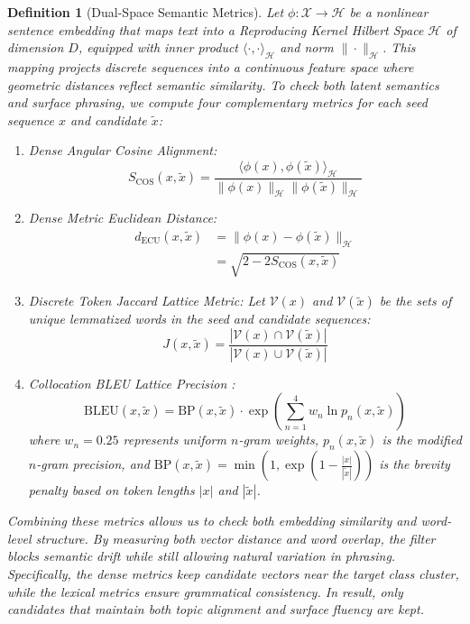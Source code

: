 \documentclass[10pt,journal,compsoc]{IEEEtran}
\newtheorem{definition}{Definition}
\begin{document}
\begin{definition}[Dual-Space Semantic Metrics]
Let $\phi: \mathcal{X} \to \mathcal{H}$ be a nonlinear sentence embedding that maps text into a Reproducing Kernel Hilbert Space $\mathcal{H}$ of dimension $D$, equipped with inner product $\langle \cdot, \cdot \rangle_\mathcal{H}$ and norm $\|\cdot\|_\mathcal{H}$. This mapping projects discrete sequences into a continuous feature space where geometric distances reflect semantic similarity. To check both latent semantics and surface phrasing, we compute four complementary metrics for each seed sequence $x$ and candidate $\tilde{x}$:
\begin{enumerate}
    \item Dense Angular Cosine Alignment:
    \begin{equation}
        S_{\text{COS}}(x, \tilde{x}) = \frac{\langle \phi(x), \phi(\tilde{x}) \rangle_\mathcal{H}}{\|\phi(x)\|_\mathcal{H} \|\phi(\tilde{x})\|_\mathcal{H}}
    \end{equation}
    \item Dense Metric Euclidean Distance:
    \begin{equation}
    \begin{aligned}
        d_{\text{ECU}}(x, \tilde{x}) &= \|\phi(x) - \phi(\tilde{x})\|_\mathcal{H} \\
        &= \sqrt{2 - 2 S_{\text{COS}}(x, \tilde{x})}
    \end{aligned}
    \end{equation}
    \item Discrete Token Jaccard Lattice Metric:
    Let $\mathcal{V}(x)$ and $\mathcal{V}(\tilde{x})$ be the sets of unique lemmatized words in the seed and candidate sequences:
    \begin{equation}
        J(x, \tilde{x}) = \frac{|\mathcal{V}(x) \cap \mathcal{V}(\tilde{x})|}{|\mathcal{V}(x) \cup \mathcal{V}(\tilde{x})|}
    \end{equation}
    \item Collocation BLEU Lattice Precision \cite{papineni2002bleu}:
    \begin{equation}
        \text{BLEU}(x, \tilde{x}) = \text{BP}(x, \tilde{x}) \cdot \exp\left(\sum_{n=1}^4 w_n \ln p_n(x, \tilde{x})\right)
    \end{equation}
    where $w_n = 0.25$ represents uniform $n$-gram weights, $p_n(x, \tilde{x})$ is the modified $n$-gram precision, and $\text{BP}(x, \tilde{x}) = \min\left(1, \exp\left(1 - \frac{|x|}{|\tilde{x}|}\right)\right)$ is the brevity penalty based on token lengths $|x|$ and $|\tilde{x}|$.
\end{enumerate}
Combining these metrics allows us to check both embedding similarity and word-level structure. By measuring both vector distance and word overlap, the filter blocks semantic drift while still allowing natural variation in phrasing. Specifically, the dense metrics keep candidate vectors near the target class cluster, while the lexical metrics ensure grammatical consistency. In result, only candidates that maintain both topic alignment and surface fluency are kept.
\end{definition}
\end{document}
